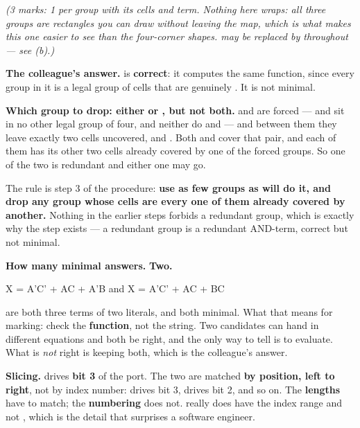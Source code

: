 {\itshape (3 marks: 1 per group with its cells and term. Nothing here wraps: all three groups are
rectangles you can draw without leaving the map, which is what makes this one easier to see than
the four-corner shapes.  may be replaced by  throughout --- see (b).)\par}

\textbf{The colleague's answer.}  is \textbf{correct}: it computes
the same function, since every group in it is a legal group of cells that are genuinely .
It is not minimal.

\textbf{Which group to drop: either  or , but not both.}  and
 are forced ---  and  sit in no other legal group of four, and
neither do  and  --- and between them they leave exactly two cells uncovered,
 and . Both  and  cover that pair, and each of them has its
other two cells already covered by one of the forced groups. So one of the two is redundant and
either one may go.

The rule is step 3 of the procedure: \textbf{use as few groups as will do it, and drop any group
whose cells are every one of them already covered by another.} Nothing in the earlier steps forbids
a redundant group, which is exactly why the step exists --- a redundant group is a redundant
AND-term, correct but not minimal. 

\textbf{How many minimal answers.} \textbf{Two.}

\begin{console}
X = A'C' + AC + A'B        and        X = A'C' + AC + BC
\end{console}

\noindent are both three terms of two literals, and both minimal. What that means for marking:
check the \textbf{function}, not the string. Two candidates can hand in different equations and
both be right, and the only way to tell is to evaluate. What is \emph{not} right is keeping both,
which is the colleague's answer. 

\textbf{Slicing.}  drives \textbf{bit 3} of the port. The two are matched \textbf{by
position, left to right}, not by index number:  drives bit 3,  drives
bit 2, and so on. The \textbf{lengths} have to match; the \textbf{numbering} does not.
 really does have the index range  and not
, which is the detail that surprises a software engineer. 

